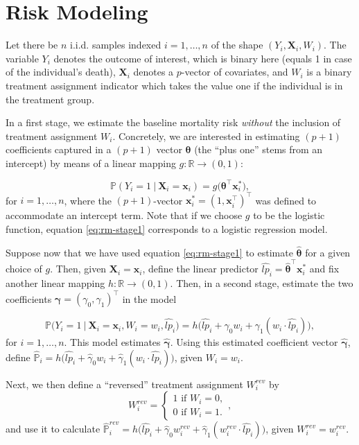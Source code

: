 \documentclass[12pt]{article}
\begin{document}
\section{Risk Modeling}
Let there be $n$ i.i.d. samples indexed $i=1,\dots,n$ of the shape $(Y_i, \mathbf{X}_i, W_i)$. The variable $Y_i$ denotes the outcome of interest, which is binary here (equals 1 in case of the individual's death), $\mathbf{X}_i$ denotes a $p$-vector of covariates, and $W_i$ is a binary treatment assignment indicator which takes the value one if the individual is in the treatment group.

In a first stage, we estimate the baseline mortality risk \textit{without} the inclusion of treatment assignment $W_i$. Concretely, we are interested in estimating $(p+1)$ coefficients captured in a $(p+1)$ vector $\bm{\theta}$ (the ``plus one'' stems from an intercept) by means of a linear mapping $g: \mathbb{R} \to (0,1)$:

\begin{equation} \label{eq:rm-stage1}
	\mathbb{P}(Y_i=1\ |\ \mathbf{X}_i = \mathbf{x}_i)
	=
	g \Big( \bm{\theta}^\top \mathbf{x}_i^* \Big),	
\end{equation}
for $i=1,\dots,n$, where the $(p+1)$-vector $\mathbf{x}_i^* = (1, \mathbf{x}_i^\top)^\top$ was defined to accommodate an intercept term. Note that if we choose $g$ to be the logistic function, equation \eqref{eq:rm-stage1} corresponds to a logistic regression model.

Suppose now that we have used equation \eqref{eq:rm-stage1} to estimate $\bm{\hat{\theta}}$ for a given choice of $g$. Then, given $\mathbf{X}_i = \mathbf{x}_i$, define the linear predictor $\widehat{lp}_i = \bm{\hat{\theta}}^\top \mathbf{x}_i^*$ and fix another linear mapping $h: \mathbb{R} \to (0,1)$. Then, in a second stage, estimate the two coefficients $\bm{\gamma} = (\gamma_0, \gamma_1)^\top$ in the model

\begin{equation}
	\mathbb{P} \Big( Y_i = 1\ |\ \mathbf{X}_i = \mathbf{x}_i, W_i = w_i, \widehat{lp}_i \Big) 
	=
	h\Big( 
	\widehat{lp}_i + \gamma_0 w_i + \gamma_1 (w_i \cdot \widehat{lp}_i)
	\Big),
\end{equation}
for $i=1,\dots,n$. This model estimates $\bm{\hat{\gamma}}$. Using this estimated coefficient vector $\bm{\hat{\gamma}}$, define $\widehat{\mathbb{P}}_i = h\Big( 
	\widehat{lp}_i + \hat{\gamma}_0 w_i + \hat{\gamma}_1 (w_i \cdot \widehat{lp}_i)
	\Big)$, given $W_i = w_i$.

Next, we then define a ``reversed'' treatment assignment $W_i^{rev}$ by  
\[
	W_i^{rev} = 
	\begin{cases}
	1 \text{ if } W_i=0,\\
	0 \text{ if } W_i=1.  
	\end{cases},
\]
and use it to calculate $\widehat{\mathbb{P}}_i^{rev} = h\Big( 
	\widehat{lp}_i + \hat{\gamma}_0 w_i^{rev} + \hat{\gamma}_1 (w_i^{rev} \cdot \widehat{lp}_i)
	\Big)$, given $W_i^{rev} = w_i^{rev}$.
	
\end{document}
